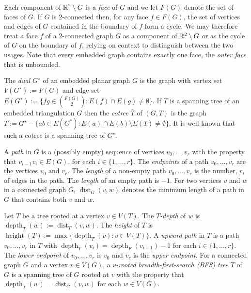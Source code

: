 \documentclass{patmorin}
\DeclareMathOperator{\height}{height}
\DeclareMathOperator{\depth}{depth}
\DeclareMathOperator{\dist}{dist}
\begin{document}
Each component of $\mathbb{R}^2\setminus G$ is a \emph{face} of $G$ and we let $F(G)$ denote the set of faces of $G$.  If $G$ is $2$-connected then, for any face $f\in F(G)$, the set of vertices and edges of $G$ contained in the boundary of $f$ form a cycle.  We may therefore treat a face $f$ of a $2$-connected graph $G$ as a component of $\mathbb{R}^2\setminus G$ or as the cycle of $G$ on the boundary of $f$, relying on context to distinguish between the two usages.  Note that every embedded graph contains exactly one face, the \emph{outer face} that is unbounded.

The \emph{dual} $G^\star$ of an embedded planar graph $G$ is the graph with vertex set $V(G^\star):=F(G)$ and edge set $E(G^{\star}):=\{fg\in \binom{F(G)}{2}:E(f)\cap E(g)\neq\emptyset\}$.  If $T$ is a spanning tree of an embedded triangulation $G$ then the \emph{cotree} $\overline{T}$ of $(G,T)$ is the graph $\overline{T}:=G^\star-\{ab\in E(G^*):E(a)\cap E(b)\setminus E(T)\neq\emptyset\}$.  It is well known that such a cotree is a spanning tree of $G^\star$.

A \emph{path} in $G$ is a (possibly empty) sequence of vertices $v_0,\ldots,v_r$ with the property that $v_{i-1}v_i\in E(G)$, for each $i\in\{1,\ldots,r\}$.  The \emph{endpoints} of a path $v_0,\ldots,v_r$ are the vertices $v_0$ and $v_r$.
The \emph{length} of a non-empty path $v_0,\ldots,v_r$ is the number, $r$, of edges in the path.  The \emph{length} of an empty path is $-1$. For two vertices $v$ and $w$ in a connected graph $G$, $\dist_G(v,w)$ denotes the minimum length of a path in $G$ that contains both $v$ and $w$.
%

Let $T$ be a tree rooted at a vertex $v\in V(T)$.  The \emph{$T$-depth} of $w$ is $\depth_T(w):=\dist_T(v,w)$.  The \emph{height} of $T$ is $\height(T):=\max\{\depth_T(v):v\in V(T)\}$.  A \emph{upward path} in $T$ is a path $v_0,\ldots,v_r$ in $T$ with $\depth_T(v_i)=\depth_F(v_{i-1})-1$ for each $i\in\{1,\ldots,r\}$.  The \emph{lower endpoint} of $v_0,\ldots,v_r$ is $v_0$ and $v_r$ is the \emph{upper endpoint}.  For a connected graph $G$ and a vertex $v\in V(G)$,  a \emph{$v$-rooted breadth-first-search (BFS) tree} $T$ of $G$ is a spanning tree of $G$ rooted at $v$ with the property that $\depth_T(w)=\dist_G(v,w)$ for each $w\in V(G)$.
\end{document}
